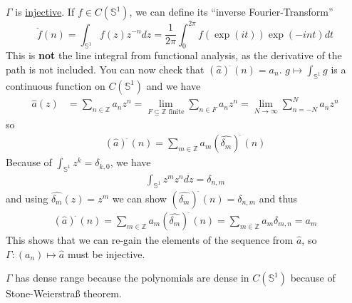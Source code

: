 \documentclass[a4paper]{article}
\newcommand{\unitcircle}{\mathds{S}^1}
\begin{document}
\begin{example}
\begin{enumerate}
		$\Gamma$ is \underline{injective}. If $f \in C(\mathds{S}^1)$, we can define its \enquote{inverse Fourier-Transform}
		\begin{equation*}
			\check{f}(n) = \int_{\mathds{S}^1} f(z) z^{-n} dz = \frac{1}{2 \pi} \int_0^{2 \pi} f(\exp(it)) \exp(-int) dt
		\end{equation*}
		This is \textbf{not} the line integral from functional analysis, as the derivative of the path is not included.
		You can now check that $(\hat{a})^{\check{~}}(n) = a_n$.
		$g \mapsto \int_{\mathds{S}^1} g$ is a continuous function on $C(\unitcircle)$ and we have
		\begin{align*}
			\hat{a}(z) &= \sum_{n \in \mathds{Z}} a_n z^n = \lim_{F \subseteq \mathds{Z} \text{ finite}} \sum_{n \in F} a_n z^n 
			= \lim_{N \to \infty} \sum_{n = -N}^N a_n z^n
		\end{align*}
		so
		\begin{align*}
			(\hat{a})^{\check{~}} (n) = \sum_{m \in \mathds{Z}} a_m (\hat{\delta_m})^{\check{~}} (n)
		\end{align*}
		Because of $\int_{\unitcircle} z^k = \delta_{k, 0}$, we have 
		\begin{align*}
			\int_{\unitcircle} z^m z^n dz = \delta_{n,m}
		\end{align*}
		and using $\hat{\delta_m}(z) = z^m$ we can show $(\hat{\delta_m})^{\check{~}} (n) = \delta_{n,m}$ and thus 
		\begin{align*}
			(\hat{a})^{\check{~}} (n) = \sum_{m \in \mathds{Z}} a_m (\hat{\delta_m})^{\check{~}} (n) = \sum_{m \in \mathds{Z}} a_m \delta_{m,n} = a_m
		\end{align*}
		This shows that we can re-gain the elements of the sequence from $\hat{a}$, so $\Gamma: (a_n) \mapsto \hat{a}$ must be injective.

		$\Gamma$ has dense range because the polynomials are dense in $C(\unitcircle)$ because of Stone-Weierstraß theorem.


\end{enumerate}
\end{example}
\end{document}
